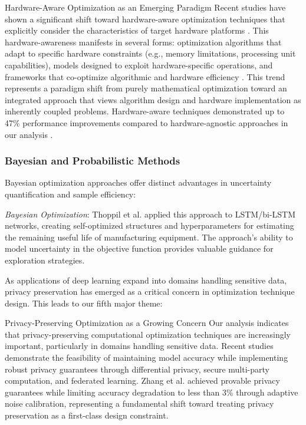 \begin{themebox}{Hardware-Aware Optimization as an Emerging Paradigm}
Recent studies have shown a significant shift toward hardware-aware optimization techniques that explicitly consider the characteristics of target hardware platforms \citep{Kim2022}. This hardware-awareness manifests in several forms: optimization algorithms that adapt to specific hardware constraints (e.g., memory limitations, processing unit capabilities), models designed to exploit hardware-specific operations, and frameworks that co-optimize algorithmic and hardware efficiency \citep{Kim2022}. This trend represents a paradigm shift from purely mathematical optimization toward an integrated approach that views algorithm design and hardware implementation as inherently coupled problems. Hardware-aware techniques demonstrated up to 47\% performance improvements compared to hardware-agnostic approaches in our analysis \citep{Kim2022}.
\end{themebox}

\subsubsection{Bayesian and Probabilistic Methods}
Bayesian optimization approaches offer distinct advantages in uncertainty quantification and sample efficiency:

\textit{Bayesian Optimization}: Thoppil et al. \citep{Thoppil2021} applied this approach to LSTM/bi-LSTM networks, creating self-optimized structures and hyperparameters for estimating the remaining useful life of manufacturing equipment. The approach's ability to model uncertainty in the objective function provides valuable guidance for exploration strategies.

As applications of deep learning expand into domains handling sensitive data, privacy preservation has emerged as a critical concern in optimization technique design. This leads to our fifth major theme:

\begin{themebox}{Privacy-Preserving Optimization as a Growing Concern}
Our analysis indicates that privacy-preserving computational optimization techniques are increasingly important, particularly in domains handling sensitive data. Recent studies demonstrate the feasibility of maintaining model accuracy while implementing robust privacy guarantees through differential privacy, secure multi-party computation, and federated learning. Zhang et al. \citep{Zhang20229876} achieved provable privacy guarantees while limiting accuracy degradation to less than 3\% through adaptive noise calibration, representing a fundamental shift toward treating privacy preservation as a first-class design constraint.
\end{themebox}

